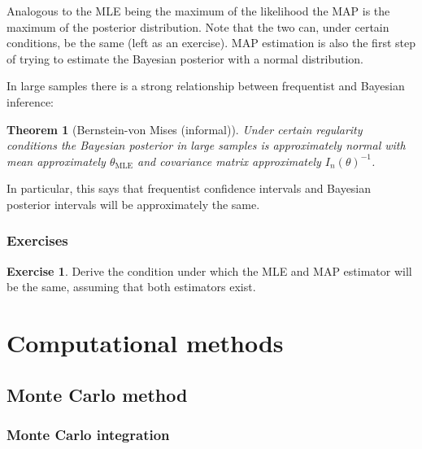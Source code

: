 \documentclass{book}
\theoremstyle{plain}%
\newtheorem{theorem}{Theorem}[section]
\theoremstyle{definition}
\newtheorem{exercise}{Exercise}[chapter]
\begin{document}
Analogous to the MLE being the maximum of the likelihood the MAP is the maximum of the posterior distribution. Note that the two can, under certain conditions, be the same (left as an exercise). MAP estimation is also the first step of trying to estimate the Bayesian posterior with a normal distribution.

In large samples there is a strong relationship between frequentist and Bayesian inference:

\begin{theorem}[Bernstein-von Mises (informal)] Under certain regularity conditions the Bayesian posterior in large samples is approximately normal with mean approximately $\theta_\text{MLE}$ and covariance matrix approximately $I_n(\theta)^{-1}$.
\end{theorem}

In particular, this says that frequentist confidence intervals and Bayesian posterior intervals will be approximately the same.

\section*{Exercises}

\begin{exercise}
Derive the condition under which the MLE and MAP estimator will be the same, assuming that both estimators exist.
\end{exercise}



%
%



\part{Computational methods}

\chapter{Monte Carlo method}

\section{Monte Carlo integration}
\end{document}
